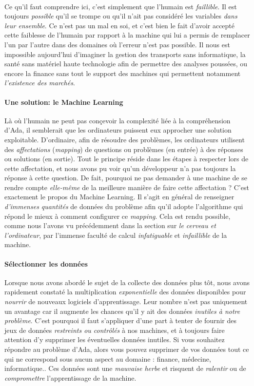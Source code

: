 \paragraph{} Ce qu'il faut comprendre ici, c'est simplement que l'humain est \emph{faillible}. Il est toujours \emph{possible} qu'il se trompe
ou qu'il n'ait pas considéré les variables \emph{dans leur ensemble}. Ce n'est pas un mal en soi, et c'est bien le fait d'avoir accepté cette
faiblesse de l'humain par rapport à la machine qui lui a permis de remplacer l'un par l'autre dans des domaines où l'erreur n'est pas possible.
Il nous est impossible aujourd'hui d'imaginer la gestion des transports sans informatique, la santé sans matériel haute technologie afin de
permettre des analyses poussées, ou encore la finance sans tout le support des machines qui permettent notamment \emph{l'existence des marchés}. 

\paragraph{Une solution: le Machine Learning} Là où l'humain ne peut pas conçevoir la complexité liée à la compréhension d'Ada, il semblerait que les
ordinateurs puissent eux approcher une solution exploitable. D'ordinaire, afin de résoudre des problèmes, les ordinateurs utilisent des \emph{affectations}
(\emph{mapping}) de questions ou problèmes (en entrée) à des réponses ou solutions (en sortie). Tout le principe réside dans les étapes à respecter lors de
cette affectation, et nous avons pu voir qu'un développeur n'a pas toujours la réponse à cette question. De fait, pourquoi ne pas demander à une 
machine de se rendre compte \emph{elle-même} de la meilleure manière de faire cette affectation ? \cite{Internet3} C'est exactement le propos du Machine
Learning. Il s'agit en général de renseigner \emph{d'immenses quantités} de données du problème afin qu'il adopte l'algorithme qui répond le mieux à
comment configurer ce \emph{mapping}. Cela est rendu possible, comme nous l'avons vu précédemment dans la section sur \emph{le cerveau et l'ordinateur},
par l'immense faculté de calcul \emph{infatiguable} et \emph{infaillible} de la machine.

\paragraph{Sélectionner les données} Lorsque nous avons abordé le sujet de la collecte des données plus tôt, nous avons rapidement constaté la 
multiplication \emph{exponentielle} des données disponibles pour \emph{nourrir} de nouveaux logiciels d'apprentissage. Leur nombre n'est pas
uniquement un avantage car il augmente les chances qu'il y ait des données \emph{inutiles à notre problème}. C'est pourquoi il faut s'appliquer
d'une part à tenter de fournir des jeux de données \emph{restreints ou contrôlés} à nos machines, et à toujours faire attention d'y supprimer les
éventuelles données inutiles. Si vous souhaitez répondre au problème d'Ada, alors vous pouvez supprimer de vos données tout ce qui ne correspond
sous aucun aspect au domaine : finance, médecine, informatique.. Ces données sont une \emph{mauvaise herbe} et risquent de \emph{ralentir} ou de
\emph{compromettre} l'apprentissage de la machine. 

